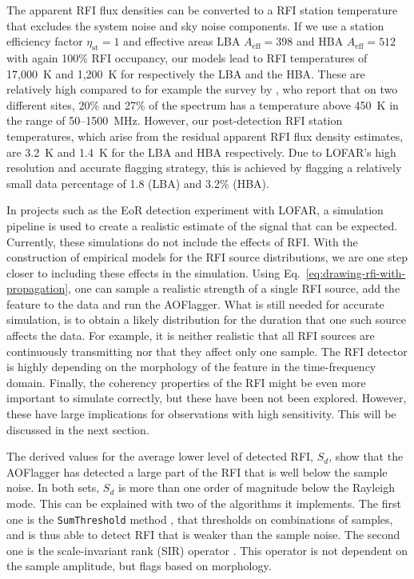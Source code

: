 \documentclass[useAMS,usenatbib]{mn2e}
\begin{document}
The apparent RFI flux densities can be converted to a RFI station temperature that excludes the system noise and sky noise components. If we use a station efficiency factor $\eta_\textrm{st}=1$ and effective areas LBA $A_\textrm{eff}=398$ and HBA $A_\textrm{eff}=512$ with again 100\% RFI occupancy, our models lead to RFI temperatures of 17,000~K and 1,200~K for respectively the LBA and the HBA. These are relatively high compared to for example the survey by \citet{lf-interference-temperature-rogers}, who report that on two different sites, 20\% and 27\% of the spectrum has a temperature above 450~K in the range of 50--1500~MHz. However, our post-detection RFI station temperatures, which arise from the residual apparent RFI flux density estimates, are 3.2~K and 1.4~K for the LBA and HBA respectively. Due to LOFAR's high resolution and accurate flagging strategy, this is achieved by flagging a relatively small data percentage of 1.8 (LBA) and 3.2\% (HBA).

In projects such as the EoR detection experiment with LOFAR, a simulation pipeline is used to create a realistic estimate of the signal that can be expected. Currently, these simulations do not include the effects of RFI. With the construction of empirical models for the RFI source distributions, we are one step closer to including these effects in the simulation. Using Eq.~\eqref{eq:drawing-rfi-with-propagation}, one can sample a realistic strength of a single RFI source, add the feature to the data and run the AOFlagger. What is still needed for accurate simulation, is to obtain a likely distribution for the duration that one such source affects the data. For example, it is neither realistic that all RFI sources are continuously transmitting nor that they affect only one sample. The RFI detector is highly depending on the morphology of the feature in the time-frequency domain. Finally, the coherency properties of the RFI might be even more important to simulate correctly, but these have been not been explored. However, these have large implications for observations with high sensitivity. This will be discussed in the next section. 

The derived values for the average lower level of detected RFI, $S_d$, show that the AOFlagger has detected a large part of the RFI that is well below the sample noise. In both sets, $S_d$ is more than one order of magnitude below the Rayleigh mode. This can be explained with two of the algorithms it implements. The first one is the {\tt SumThreshold} method \citep{post-correlation-rfi-classification}, that thresholds on combinations of samples, and is thus able to detect RFI that is weaker than the sample noise. The second one is the scale-invariant rank (SIR) operator \citep{scale-invariant-rank-operator}. This operator is not dependent on the sample amplitude, but flags based on morphology.
\end{document}
